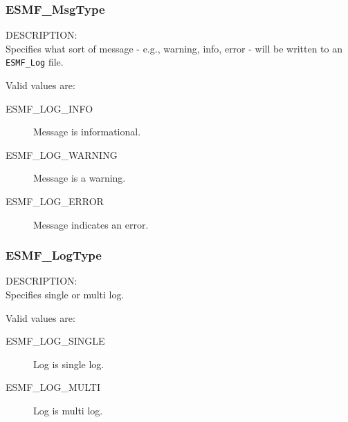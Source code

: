 
\subsubsection{ESMF\_MsgType}

\label{opt:msgtype}
{\sf DESCRIPTION:\\}
Specifies what sort of message - e.g., warning, info,
error - will be written to an {\tt ESMF\_Log} file.

Valid values are:
\begin{description}
   \item [ESMF\_LOG\_INFO] 
         Message is informational.
   \item [ESMF\_LOG\_WARNING]
         Message is a warning.
   \item [ESMF\_LOG\_ERROR]
         Message indicates an error.
\end{description}

\subsubsection{ESMF\_LogType}

\label{opt:logtype}
{\sf DESCRIPTION:\\}
Specifies single or multi log.

Valid values are:
\begin{description}
   \item [ESMF\_LOG\_SINGLE] 
         Log is single log.
   \item [ESMF\_LOG\_MULTI]
         Log is multi log.
\end{description}





